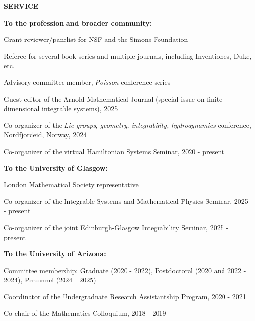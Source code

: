 \documentclass[a4paper, 12pt]{article}
\begin{document}
\newpage

\textbf{SERVICE} \par\smallskip
\textbf{To the profession and broader community:}
\begin{compactitem}
\item Grant reviewer/panelist for NSF and the Simons Foundation
\item Referee for several book series and multiple journals, including Inventiones, Duke, etc.
\item Advisory committee member, \emph{Poisson} conference series
\item Guest editor of the Arnold Mathematical Journal (special issue on finite dimensional integrable systems), 2025
\item Co-organizer of the \emph{Lie groups, geometry, integrability, hydrodynamics} conference, Nordfjordeid, Norway, 2024
\item Co-organizer of the virtual Hamiltonian Systems Seminar, 2020 - present
\end{compactitem}
 \par\smallskip
\textbf{To the University of Glasgow:}
\begin{compactitem}
\item London Mathematical Society representative 
\item Co-organizer of the Integrable Systems and Mathematical Physics Seminar, 2025 - present
\item Co-organizer of the joint Edinburgh-Glasgow Integrability Seminar, 2025 - present
\end{compactitem}
  \par\smallskip
\textbf{To the University of Arizona:}
\begin{compactitem}
\item Committee membership: Graduate (2020 - 2022),  Postdoctoral (2020 and 2022 - 2024), Personnel (2024 - 2025)
\item Coordinator of the Undergraduate Research Assistantship Program, 2020 - 2021
\item Co-chair of the {Mathematics Colloquium}, 2018 - 2019
\end{compactitem}
\end{document}
